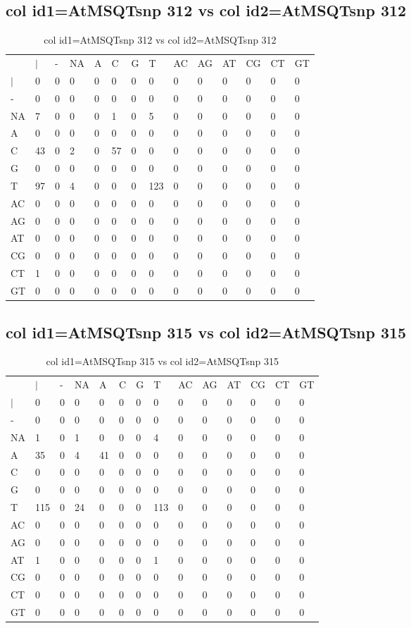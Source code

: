 \subsection{col id1=AtMSQTsnp 312 vs col id2=AtMSQTsnp 312}
\begin{center}
\begin{longtable}{|l|l|l|l|l|l|l|l|l|l|l|l|l|l|}
\caption{col id1=AtMSQTsnp 312 vs col id2=AtMSQTsnp 312} \label{table_dm846}\\
\hline
\\
\hline
&$|$&-&NA&A&C&G&T&AC&AG&AT&CG&CT&GT\\
$|$&0&0&0&0&0&0&0&0&0&0&0&0&0\\
-&0&0&0&0&0&0&0&0&0&0&0&0&0\\
NA&7&0&0&0&1&0&5&0&0&0&0&0&0\\
A&0&0&0&0&0&0&0&0&0&0&0&0&0\\
C&43&0&2&0&57&0&0&0&0&0&0&0&0\\
G&0&0&0&0&0&0&0&0&0&0&0&0&0\\
T&97&0&4&0&0&0&123&0&0&0&0&0&0\\
AC&0&0&0&0&0&0&0&0&0&0&0&0&0\\
AG&0&0&0&0&0&0&0&0&0&0&0&0&0\\
AT&0&0&0&0&0&0&0&0&0&0&0&0&0\\
CG&0&0&0&0&0&0&0&0&0&0&0&0&0\\
CT&1&0&0&0&0&0&0&0&0&0&0&0&0\\
GT&0&0&0&0&0&0&0&0&0&0&0&0&0\\
\hline
\end{longtable}
\end{center}

\subsection{col id1=AtMSQTsnp 315 vs col id2=AtMSQTsnp 315}
\begin{center}
\begin{longtable}{|l|l|l|l|l|l|l|l|l|l|l|l|l|l|}
\caption{col id1=AtMSQTsnp 315 vs col id2=AtMSQTsnp 315} \label{table_dm848}\\
\hline
\\
\hline
&$|$&-&NA&A&C&G&T&AC&AG&AT&CG&CT&GT\\
$|$&0&0&0&0&0&0&0&0&0&0&0&0&0\\
-&0&0&0&0&0&0&0&0&0&0&0&0&0\\
NA&1&0&1&0&0&0&4&0&0&0&0&0&0\\
A&35&0&4&41&0&0&0&0&0&0&0&0&0\\
C&0&0&0&0&0&0&0&0&0&0&0&0&0\\
G&0&0&0&0&0&0&0&0&0&0&0&0&0\\
T&115&0&24&0&0&0&113&0&0&0&0&0&0\\
AC&0&0&0&0&0&0&0&0&0&0&0&0&0\\
AG&0&0&0&0&0&0&0&0&0&0&0&0&0\\
AT&1&0&0&0&0&0&1&0&0&0&0&0&0\\
CG&0&0&0&0&0&0&0&0&0&0&0&0&0\\
CT&0&0&0&0&0&0&0&0&0&0&0&0&0\\
GT&0&0&0&0&0&0&0&0&0&0&0&0&0\\
\hline
\end{longtable}
\end{center}

